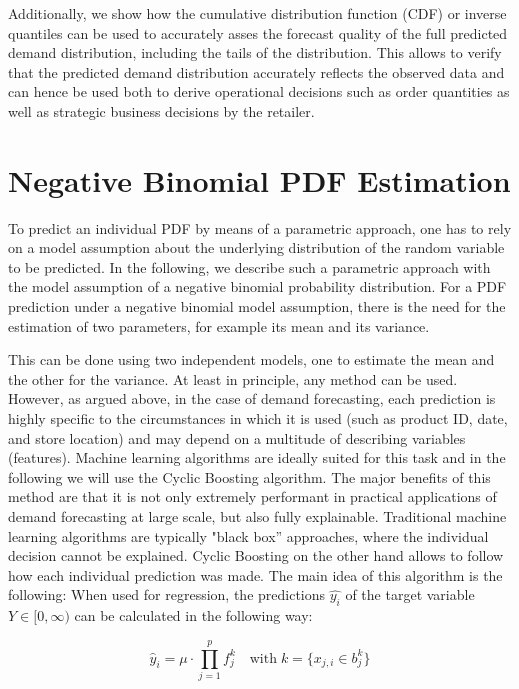 \documentclass[BCOR=1mm, DIV=calc,10pt,
twoside=true,
twocolumn,
headings=normal]{scrartcl}
\begin{document}
Additionally, we show how the cumulative distribution function (CDF) or inverse quantiles can be used to accurately asses the forecast quality of the full predicted demand distribution, including the tails of the distribution. This allows to verify that the predicted demand distribution accurately reflects the observed data and can hence be used both to derive operational decisions such as  order quantities as well as strategic business decisions by the retailer.


\section{Negative Binomial PDF Estimation}
\label{sec:pdfEstimation}

To predict an individual PDF by means of a parametric approach, one has to rely on a model assumption about the underlying distribution of the random variable to be predicted. In the following, we describe such a parametric approach with the model assumption of a negative binomial probability distribution. For a PDF prediction under a negative binomial model assumption, there is the need for the estimation of two parameters, for example its mean and its variance.

This can be done using two independent models, one to estimate the mean and the other for the variance. At least in principle, any method can be used. However, as argued above, in the case of demand forecasting, each prediction is highly specific to the circumstances in which it is used (such as product ID, date, and store location) and may depend on  a multitude of describing variables (features). Machine learning algorithms are ideally suited for this task and in the following we will use the Cyclic Boosting algorithm. The major benefits of this method are that it is not only extremely performant in practical applications of demand forecasting at large scale, but also fully explainable. Traditional machine learning algorithms are typically "black box'' approaches, where the individual decision cannot be explained. Cyclic Boosting on the other hand allows to follow how each individual prediction was made. The main idea of this algorithm is the following: When used for regression, the predictions $\hat{y_i}$ of the  target variable $Y \in [0,\infty)$ can be calculated in the following way:

\begin{equation} \label{eqn:cb}
\hat{y}_i = \mu \cdot \prod \limits_{j=1}^p f^k_j \quad \text{with}\; k=\{ x_{j,i} \in b^k_j\}
\end{equation}
\end{document}
